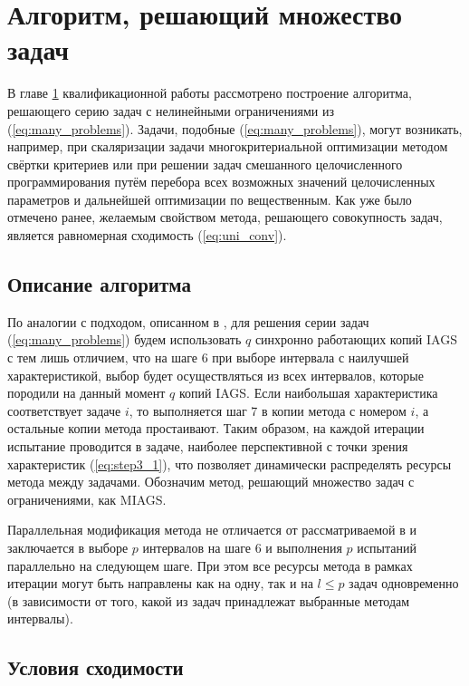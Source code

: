 \section{Алгоритм, решающий множество задач}
\label{sec:multi_algo}

В главе \ref{sec:multi_algo} квалификационной работы рассмотрено построение алгоритма, решающего серию задач с нелинейными ограничениями из (\ref{eq:many_problems}).
Задачи, подобные (\ref{eq:many_problems}), могут возникать, например, при скаляризации задачи многокритериальной оптимизации
методом свёртки критериев или при решении задач смешанного целочисленного программирования
путём перебора всех возможных значений целочисленных параметров и дальнейшей оптимизации по вещественным.
Как уже было отмечено ранее, желаемым свойством метода, решающего совокупность задач, является равномерная сходимость (\ref{eq:uni_conv}).

\subsection{Описание алгоритма}

По аналогии с подходом, описанном в \cite{BarkalovStrongin2018}, для решения серии задач (\ref{eq:many_problems}) будем
использовать \(q\) синхронно работающих копий IAGS с тем лишь отличием, что на шаге 6 при выборе
интервала с наилучшей характеристикой, выбор будет осуществляться из всех интервалов, которые
породили на данный момент \(q\) копий IAGS. Если наибольшая характеристика соответствует
задаче \(i\), то выполняется шаг 7 в копии метода с номером \(i\), а остальные копии метода простаивают.
Таким образом, на каждой итерации испытание проводится в задаче, наиболее перспективной с точки зрения
характеристик (\ref{eq:step3_1}), что позволяет динамически распределять ресурсы метода между задачами.
Обозначим метод, решающий множество задач с ограничениями, как MIAGS.

Параллельная модификация метода не отличается от рассматриваемой в \cite{BarkalovStrongin2018}
и заключается в выборе \(p\) интервалов на шаге 6 и выполнения \(p\) испытаний параллельно
на следующем шаге. При этом все ресурсы метода в рамках итерации могут быть направлены как на одну, так и
на \(l\leqslant p\) задач одновременно (в зависимости от того, какой из задач принадлежат выбранные методам интервалы).

\subsection{Условия сходимости}
\label{sec:conv_method}

